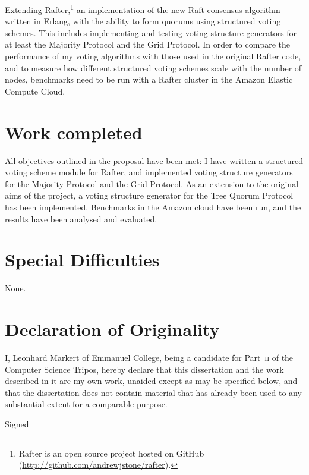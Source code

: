 \documentclass[12pt,chapterprefix=true,toc=bibliography,numbers=noendperiod,
               footnotes=multiple,twoside]{scrreprt}
\begin{document}
Extending Rafter,\footnote{Rafter is an open source project hosted on GitHub (\url{http://github.com/andrewjstone/rafter}).} an implementation of the new Raft \autocite{raft} consensus algorithm written in Erlang, with the ability to form quorums using structured voting schemes. This includes implementing and testing voting structure generators for at least the Majority Protocol and the Grid Protocol. In order to compare the performance of my voting algorithms with those used in the original Rafter code, and to measure how different structured voting schemes scale with the number of nodes, benchmarks need to be run with a Rafter cluster in the Amazon Elastic Compute Cloud.

\section*{Work completed}
\label{sc:work-completed}

All objectives outlined in the proposal have been met: I have written a structured voting scheme module for Rafter, and implemented voting structure generators for the Majority Protocol and the Grid Protocol. As an extension to the original aims of the project, a voting structure generator for the Tree Quorum Protocol has been implemented. Benchmarks in the Amazon cloud have been run, and the results have been analysed and evaluated.

\section*{Special Difficulties}
\label{sc:special-difficulties}

None.

\newpage

\section*{Declaration of Originality}
\label{sc:declaration-of-originality}

I, Leonhard Markert of Emmanuel College, being a candidate for Part~\textsc{ii} of the Computer Science Tripos, hereby declare that this dissertation and the work described in it are my own work, unaided except as may be specified below, and that the dissertation does not contain material that has already been used to any substantial extent for a comparable purpose.

\vspace{0.3in}
Signed
\end{document}
